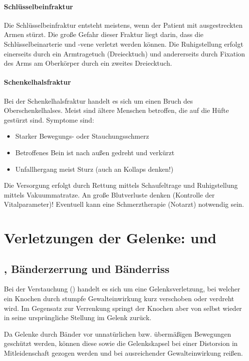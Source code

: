 \paragraph{Schlüsselbeinfraktur} Die Schlüsselbeinfraktur
entsteht meistens, wenn der Patient mit ausgestreckten Armen
stürzt. Die große Gefahr dieser Fraktur liegt darin, dass
die Schlüsselbeinarterie und -vene verletzt werden können.
Die Ruhigstellung erfolgt einerseits durch ein Armtragetuch
(Dreiecktuch) und andererseits durch Fixation des Arms am
Oberkörper durch ein zweites Dreiecktuch.

\paragraph{Schenkelhalsfraktur} Bei der Schenkelhalsfraktur
handelt es sich um einen Bruch des Oberschenkelhalses. Meist
sind ältere Menschen betroffen, die auf die Hüfte gestürzt
sind. Symptome sind:
\begin{itemize}
	\item Starker Bewegungs- oder Stauchungsschmerz
	\item Betroffenes Bein ist nach außen gedreht und verkürzt
	\item Unfallhergang meist Sturz (auch an Kollaps denken!)
\end{itemize}

Die Versorgung erfolgt durch Rettung mittels Schaufeltrage
und Ruhigstellung mittels Vakuummatratze. An große
Blutverluste denken (Kontrolle der Vitalparameter)!
Eventuell kann eine Schmerztherapie (Notarzt) notwendig
sein.

\section{Verletzungen der Gelenke: 
 und }


\subsection{, Bänderzerrung und 
Bänderriss}

\label{topic:verstauchung-tra}

\Text{\TxBeschreibung}
{%
%
Bei der Verstauchung () handelt es sich um
eine Gelenksverletzung, bei welcher ein Knochen durch 
stumpfe Gewalteinwirkung kurz verschoben oder verdreht wird.
Im Gegensatz zur Verrenkung springt der Knochen aber von
selbst wieder in seine ursprüngliche Stellung im Gelenk
zurück.

Da Gelenke durch Bänder vor unnatürlichen bzw. übermäßigen
Bewegungen geschützt werden, können diese sowie die
Gelenkskapsel bei einer Distorsion in Mitleidenschaft
gezogen werden und bei ausreichender Gewalteinwirkung reißen.
}



